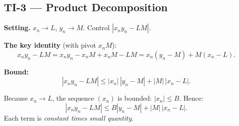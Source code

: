 \subsection{TI-3 — Product Decomposition}

\textbf{Setting.} $x_n \to L$, $y_n \to M$. Control $|x_n y_n - LM|$.

\textbf{The key identity} (with pivot $x_n M$):
\[
  x_n y_n - LM
  = x_n y_n - x_n M + x_n M - LM
  = x_n(y_n - M) + M(x_n - L).
\]

\textbf{Bound:}
\[
  |x_n y_n - LM|
  \le |x_n|\,|y_n - M| + |M|\,|x_n - L|.
\]

Because $x_n \to L$, the sequence $(x_n)$ is bounded: $|x_n| \le B$.
Hence:
\[
  |x_n y_n - LM| \le B|y_n - M| + |M|\,|x_n - L|.
\]
Each term is \emph{constant times small quantity}.

